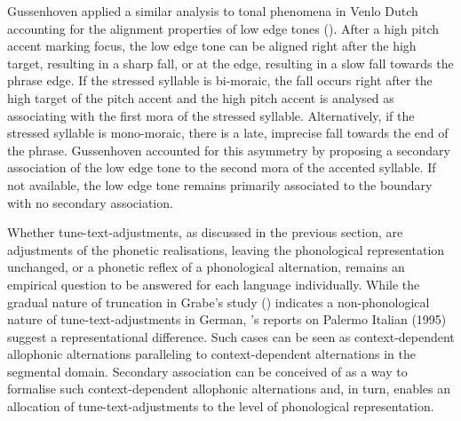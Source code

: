 Gussenhoven applied a similar analysis to tonal phenomena in Venlo Dutch accounting for the alignment properties of low edge tones (\citealt{GussenhovenVanderVliet1999,Gussenhoven2000,Gussenhoven2002}). After a high pitch accent marking focus, the low edge tone can be aligned right after the high target, resulting in a sharp fall, or at the edge, resulting in a slow fall towards the phrase edge. If the stressed syllable is bi-moraic, the fall occurs right after the high target of the pitch accent and the high pitch accent is analysed as associating with the first mora of the stressed syllable. Alternatively, if the stressed syllable is mono-moraic, there is a late, imprecise fall towards the end of the phrase. Gussenhoven accounted for this asymmetry by proposing a secondary association of the low edge tone to the second mora of the accented syllable. If not available, the low edge tone remains primarily associated to the boundary with no secondary association.

  
Whether tune-text-adjustments, as discussed in the previous section, are adjustments of the phonetic realisations, leaving the phonological representation unchanged, or a phonetic reflex of a phonological alternation, remains an empirical question to be answered for each language individually. While the gradual nature of truncation in Grabe’s study (\citeyear{Grabe1998}) indicates a non-phonological nature of tune-text-adjustments in German, \citeauthor{Grice1995}’s reports on Palermo Italian (1995) suggest a representational difference. Such cases can be seen as context-dependent allophonic alternations paralleling to context-dependent alternations in the segmental domain. Secondary association can be conceived of as a way to formalise such context-dependent allophonic alternations and, in turn, enables an allocation of tune-text-adjustments to the level of phonological representation. 

